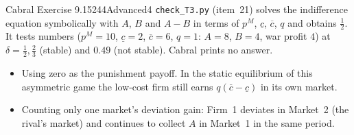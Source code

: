 \begin{exsol}{Cabral Exercise 9.15}{244}{Advanced}{4}
\verify \texttt{check\_T3.py} (item~21) solves the indifference equation symbolically with $A$, $B$ and
$A - B$ in terms of $p^M$, $\underline c$, $\overline c$, $q$ and obtains $\frac12$. It tests numbers
($p^M = 10$, $\underline c = 2$, $\overline c = 6$, $q = 1$: $A = 8$, $B = 4$, war profit $4$) at $\delta = \frac12,
\frac23$ (stable) and $0.49$ (not stable). Cabral prints no answer.

\mistakes
\begin{itemize}
  \item Using zero as the punishment payoff. In the static equilibrium of this asymmetric game the low-cost firm
  still earns $q(\overline c - \underline c)$ in its own market.
  \item Counting only one market's deviation gain: Firm~1 deviates in Market~2 (the rival's market) and
  continues to collect $A$ in Market~1 in the same period.
\end{itemize}

\end{exsol}
